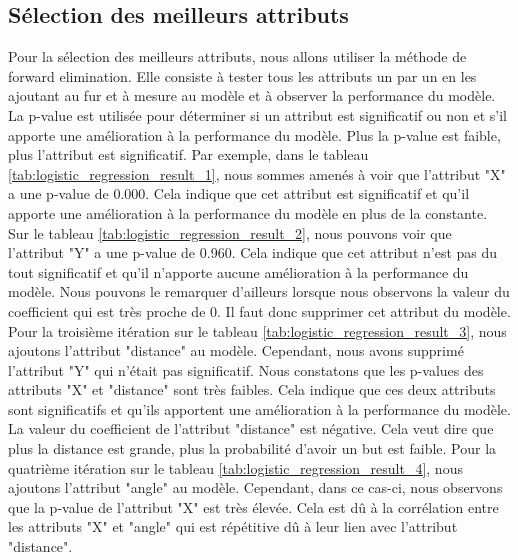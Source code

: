 \documentclass[12pt]{article}
\begin{document}
\subsection{Sélection des meilleurs attributs}
\label{sec:selection_attributs}
Pour la sélection des meilleurs attributs, nous allons utiliser la méthode de forward elimination.
Elle consiste à tester tous les attributs un par un en les ajoutant au fur et à mesure au modèle et à observer la performance du modèle.
La p-value est utilisée pour déterminer si un attribut est significatif ou non et s'il apporte une amélioration à la performance du modèle.
Plus la p-value est faible, plus l'attribut est significatif.
\newline\newline
Par exemple, dans le tableau \ref{tab:logistic_regression_result_1}, nous sommes amenés à voir que l'attribut "X" a une p-value de 0.000.
Cela indique que cet attribut est significatif et qu'il apporte une amélioration à la performance du modèle en plus de la constante.
\newline\newline
Sur le tableau \ref{tab:logistic_regression_result_2}, nous pouvons voir que l'attribut "Y" a une p-value de 0.960.
Cela indique que cet attribut n'est pas du tout significatif et qu'il n'apporte aucune amélioration à la performance du modèle.
Nous pouvons le remarquer d'ailleurs lorsque nous observons la valeur du coefficient qui est très proche de 0.
Il faut donc supprimer cet attribut du modèle.
\newline\newline
Pour la troisième itération sur le tableau \ref{tab:logistic_regression_result_3}, nous ajoutons l'attribut "distance" au modèle.
Cependant, nous avons supprimé l'attribut "Y" qui n'était pas significatif.
Nous constatons que les p-values des attributs "X" et "distance" sont très faibles.
Cela indique que ces deux attributs sont significatifs et qu'ils apportent une amélioration à la performance du modèle.
La valeur du coefficient de l'attribut "distance" est négative.
Cela veut dire que plus la distance est grande, plus la probabilité d'avoir un but est faible.
\newline\newline
Pour la quatrième itération sur le tableau \ref{tab:logistic_regression_result_4}, nous ajoutons l'attribut "angle" au modèle.
Cependant, dans ce cas-ci, nous observons que la p-value de l'attribut "X" est très élevée.
Cela est dû à la corrélation entre les attributs "X" et "angle" qui est répétitive dû à leur lien avec l'attribut "distance".
\end{document}
